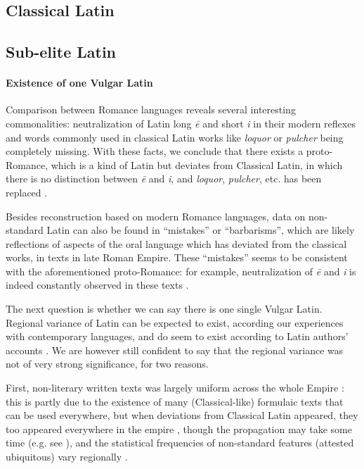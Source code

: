 \documentclass[a4paper, oneside, 12pt]{report}
\newcommand*{\citepage}[1]{p.~{#1}}
\newcommand*{\citepages}[1]{pp.~{#1}}
\newcommand{\form}[1]{\emph{#1}}
\begin{document}
\subsection{Classical Latin}

\subsection{Sub-elite Latin}\label{sec:introduction.history.sub-elite}

\paragraph*{Existence of one Vulgar Latin}
Comparison between Romance languages reveals several interesting commonalities:
neutralization of Latin long \form{\={e}} and short \form{i}
in their modern reflexes
and words commonly used in classical Latin works like \form{loquor} or \form{pulcher}
being completely missing.
With these facts, we conclude that there exists a proto-Romance,
which is a kind of Latin but deviates from Classical Latin,
in which there is no distinction between \form{\={e}} and \form{i}, 
and \form{loquor}, \form{pulcher}, etc. has been replaced
\citep[\citepages{1-3}]{herman2010vulgar}.

Besides reconstruction based on modern Romance languages,
data on non-standard Latin can also be found in
``mistakes'' or ``barbarisms'', 
which are likely reflections of aspects of the oral language 
which has deviated from the classical works, 
in texts in late Roman Empire.
These ``mistakes'' seems to be consistent with the aforementioned proto-Romance:
for example, neutralization of \form{\={e}} and \form{i} is indeed constantly observed in these texts
\citep[\citepage{4}]{herman2010vulgar}.

The next question is whether we can say there is one single Vulgar Latin.
Regional variance of Latin can be expected to exist,
according our experiences with contemporary languages,
and do seem to exist according to Latin authors' accounts
\citep[\citepage{116}]{herman2010vulgar}.
We are however still confident to say that the regional variance 
was not of very strong significance, for two reasons.

First, non-literary written texts was largely uniform across the whole Empire
\citep[\citepage{117}]{herman2010vulgar}:
this is partly due to the existence of 
many (Classical-like) formulaic texts that can be used everywhere,
but when deviations from Classical Latin appeared,
they too appeared everywhere in the empire
\citep[\citepage{235}]{clackson2011blackwell},
though the propagation may take some time
(e.g. see ),
and the statistical frequencies of non-standard features (attested ubiquitous) vary regionally
\citep[\citepage{118}]{herman2010vulgar}.
\end{document}
